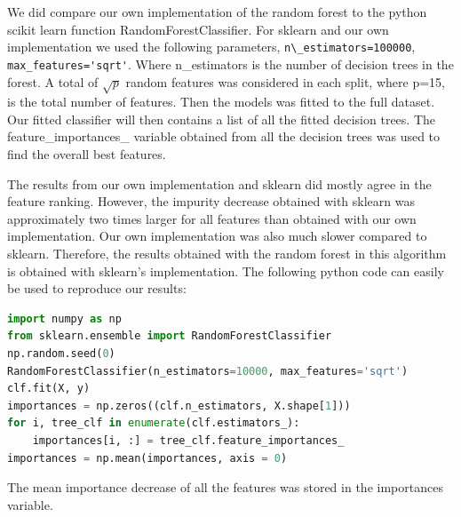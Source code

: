 
We did compare our own implementation of the random forest to the python
scikit learn function RandomForestClassifier. For sklearn and our own
implementation we used the following parameters, \verb|n\_estimators=100000|,
\verb|max_features='sqrt'|. Where n\_estimators is the number of decision trees
in the forest. A total of $\sqrt{p} $ random features was considered in each
split, where p=15, is the total number of features. Then the models was fitted
to the full dataset. Our fitted classifier will then contains a list of all the
fitted decision trees. The feature\_importances\_ variable obtained from all the
decision trees was used to find the overall best features.  

The results from our own implementation and sklearn did mostly agree in the
feature ranking. However, the impurity decrease obtained with sklearn was
approximately two times larger for all features than obtained with our own
implementation. Our own implementation was also much slower compared to
sklearn. Therefore, the results obtained with the random forest in this algorithm
is obtained with sklearn's implementation. The following python code can easily
be used to reproduce our results:  
\begin{lstlisting}[language=Python]
import numpy as np 
from sklearn.ensemble import RandomForestClassifier
np.random.seed(0)
RandomForestClassifier(n_estimators=10000, max_features='sqrt')
clf.fit(X, y)
importances = np.zeros((clf.n_estimators, X.shape[1]))
for i, tree_clf in enumerate(clf.estimators_): 
    importances[i, :] = tree_clf.feature_importances_
importances = np.mean(importances, axis = 0)
\end{lstlisting}
The mean importance decrease of all the features was stored in the importances
variable.  
























